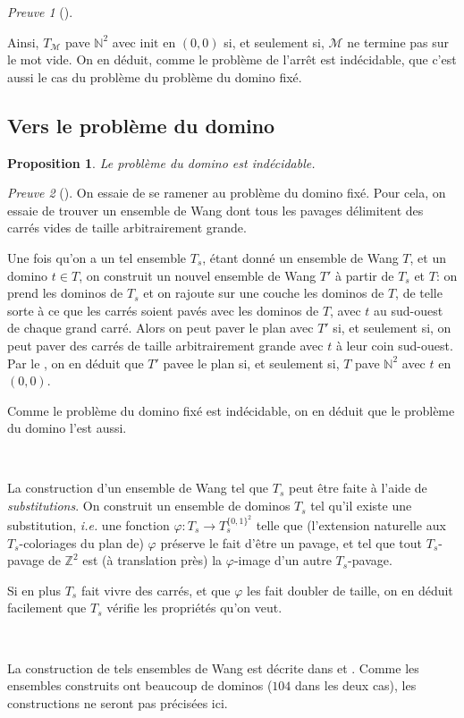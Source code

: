 \documentclass{scrartcl}
\newcommand{\N}{\mathbb N}
\newcommand{\Z}{\mathbb Z}
\newtheorem{proposition}{Proposition}
\theoremstyle{definition}
\theoremstyle{remark}
\newtheorem*{preuve}{Preuve}
\begin{document}
\begin{preuve}[]
  \ 

  Ainsi, $T_\mathcal M$ pave $\N^2$ avec $\mathrm{init}$ en $(0,0)$ si, et seulement si, $\mathcal M$ ne termine pas sur le mot vide. On en déduit, comme le problème de l'arrêt est indécidable, que c'est aussi le cas du problème du problème du domino fixé.
\end{preuve}

\subsection{Vers le problème du domino}

\begin{proposition}
  Le problème du domino est indécidable.
\end{proposition}

\begin{preuve}[]
  On essaie de se ramener au problème du domino fixé. Pour cela, on essaie de trouver un ensemble de Wang dont tous les pavages délimitent des carrés vides de taille arbitrairement grande.
  
  Une fois qu'on a un tel ensemble $T_s$, étant donné un ensemble de Wang $T$, et un domino $t\in T$, on construit un nouvel ensemble de Wang $T'$ à partir de $T_s$ et $T$: on prend les dominos de $T_s$ et on rajoute sur une couche les dominos de $T$, de telle sorte à ce que les carrés soient pavés avec les dominos de $T$, avec $t$ au sud-ouest de chaque grand carré. Alors on peut paver le plan avec $T'$ si, et seulement si, on peut paver des carrés de taille arbitrairement grande avec $t$ à leur coin sud-ouest. Par le , on en déduit que $T'$ pavee le plan si, et seulement si, $T$ pave $\N^2$ avec $t$ en $(0,0)$.

  Comme le problème du domino fixé est indécidable, on en déduit que le problème du domino l'est aussi.

  \

  La construction d'un ensemble de Wang tel que $T_s$ peut être faite à l'aide de \emph{substitutions}. On construit un ensemble de dominos $T_s$ tel qu'il existe une substitution, \emph{i.e.} une fonction $\varphi:T_s\to T_s^{\{0,1\}^2}$ telle que (l'extension naturelle aux $T_s$-coloriages du plan de) $\varphi$ préserve le fait d'être un pavage, et tel que tout $T_s$-pavage de $\Z^2$ est (à translation près) la $\varphi$-image d'un autre $T_s$-pavage.
  
  Si en plus $T_s$ fait vivre des carrés, et que $\varphi$ les fait doubler de taille, on en déduit facilement que $T_s$ vérifie les propriétés qu'on veut.

  \

  La construction de tels ensembles de Wang est décrite dans \cite{shifts} et \cite{dom_prob}. Comme les ensembles construits ont beaucoup de dominos ($104$ dans les deux cas), les constructions ne seront pas précisées ici.
\end{preuve}
\end{document}
